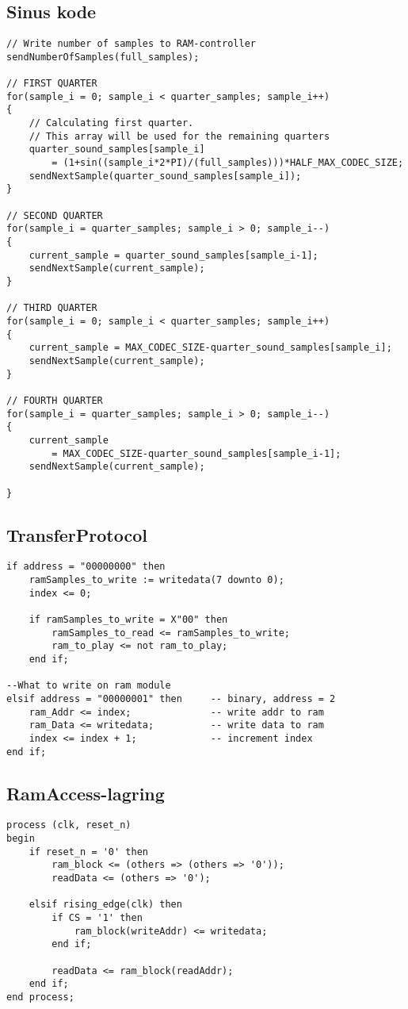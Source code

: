 \documentclass[Aflevering]{subfiles}
\begin{document}
\subsection{Sinus kode}
\label{App:SinusKode}
\begin{lstlisting}[style=code-C++, caption=Sinus generation for data output, label=lst:sinusG]
// Write number of samples to RAM-controller
sendNumberOfSamples(full_samples);

// FIRST QUARTER
for(sample_i = 0; sample_i < quarter_samples; sample_i++)
{
	// Calculating first quarter. 
	// This array will be used for the remaining quarters
	quarter_sound_samples[sample_i] 
		= (1+sin((sample_i*2*PI)/(full_samples)))*HALF_MAX_CODEC_SIZE;
	sendNextSample(quarter_sound_samples[sample_i]);
}

// SECOND QUARTER
for(sample_i = quarter_samples; sample_i > 0; sample_i--)
{
	current_sample = quarter_sound_samples[sample_i-1];
	sendNextSample(current_sample);
}

// THIRD QUARTER
for(sample_i = 0; sample_i < quarter_samples; sample_i++)
{
	current_sample = MAX_CODEC_SIZE-quarter_sound_samples[sample_i];
	sendNextSample(current_sample);
}

// FOURTH QUARTER
for(sample_i = quarter_samples; sample_i > 0; sample_i--)
{
	current_sample 
		= MAX_CODEC_SIZE-quarter_sound_samples[sample_i-1];
	sendNextSample(current_sample);
	
}

\end{lstlisting}

\subsection{TransferProtocol}
\label{app:TP}
\begin{lstlisting}[style=code-VHDL, caption=TransferProtol valg af samples eller data, label=app:TP]
if address = "00000000" then			
	ramSamples_to_write := writedata(7 downto 0);
	index <= 0;
	
	if ramSamples_to_write = X"00" then
		ramSamples_to_read <= ramSamples_to_write;
		ram_to_play <= not ram_to_play;	
	end if;
	
--What to write on ram module
elsif address = "00000001" then	 	-- binary, address = 2
	ram_Addr <= index;				-- write addr to ram
	ram_Data <= writedata; 			-- write data to ram
	index <= index + 1;				-- increment index				    
end if;
\end{lstlisting}

\subsection{RamAccess-lagring}
\label{app:RA}
\begin{lstlisting}[style=code-VHDL, caption=Process for lagring i ram-modulerne]
process (clk, reset_n)
begin
	if reset_n = '0' then
		ram_block <= (others => (others => '0'));
		readData <= (others => '0');
		
	elsif rising_edge(clk) then
		if CS = '1' then
			ram_block(writeAddr) <= writedata;
		end if;
		
		readData <= ram_block(readAddr);
	end if;
end process;
\end{lstlisting}
\end{document}
